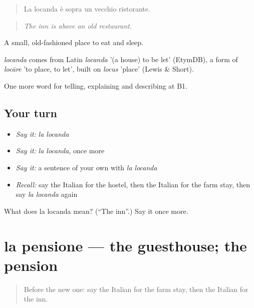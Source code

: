 \begin{quote}
La locanda è sopra un vecchio ristorante.
\end{quote}

\begin{quote}
\emph{The inn is above an old restaurant.}
\end{quote}

A small, old-fashioned place to eat and sleep.

\begin{cousinweb}
\emph{locanda} comes from Latin \emph{locanda} '(a house) to be let' (EtymDB), a form of \emph{locāre} 'to place, to let', built on \emph{locus} 'place' (Lewis \& Short).
\end{cousinweb}

\begin{grammarlens}[title={What you've built}]
One more word for telling, explaining and describing at B1.
\end{grammarlens}

\subsection*{Your turn}
\begin{itemize}
\raggedright
  \item \emph{Say it:} \emph{la locanda}
  \item \emph{Say it:} \emph{la locanda}, once more
  \item \emph{Say it:} a sentence of your own with \emph{la locanda}
  \item \emph{Recall:} say the Italian for the hostel, then the Italian for the farm stay, then say \emph{la locanda} again
\end{itemize}

\begin{tcolorbox}[breakable,colback=teal!4,colframe=teal!35!black,title={Before you move on}]
What does la locanda mean? (\textquotedblleft{}The inn\textquotedblright{}.) Say it once more.
\end{tcolorbox}
\section[la pensione]{la pensione — the guesthouse; the pension}

\label{lesson:IT-C429-pensione}



\begin{quote}
Before the new one: say the Italian for the farm stay, then the Italian for the inn.
\end{quote}

